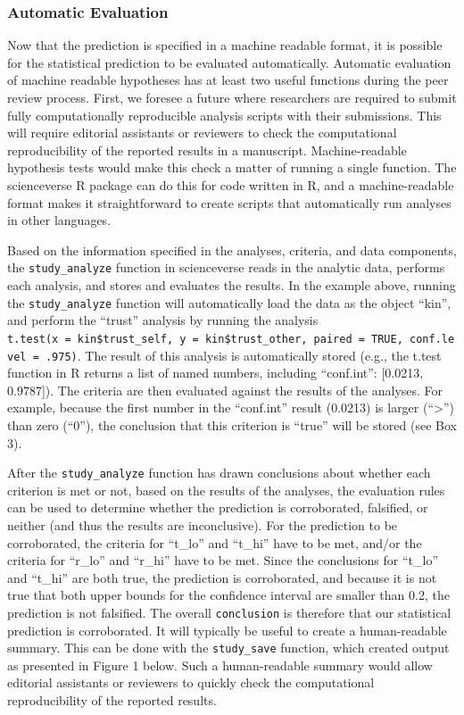 \documentclass[
  english,
  doc,floatsintext]{apa6}
\begin{document}
\hypertarget{automatic-evaluation}{%
\subsubsection{Automatic Evaluation}\label{automatic-evaluation}}

Now that the prediction is specified in a machine readable format, it is possible for the statistical prediction to be evaluated automatically. Automatic evaluation of machine readable hypotheses has at least two useful functions during the peer review process. First, we foresee a future where researchers are required to submit fully computationally reproducible analysis scripts with their submissions. This will require editorial assistants or reviewers to check the computational reproducibility of the reported results in a manuscript. Machine-readable hypothesis tests would make this check a matter of running a single function. The scienceverse R package can do this for code written in R, and a machine-readable format makes it straightforward to create scripts that automatically run analyses in other languages.

Based on the information specified in the analyses, criteria, and data components, the \texttt{study\_analyze} function in scienceverse reads in the analytic data, performs each analysis, and stores and evaluates the results. In the example above, running the \texttt{study\_analyze} function will automatically load the data as the object \enquote{kin}, and perform the \enquote{trust} analysis by running the analysis \texttt{t.test(x\ =\ kin\$trust\_self,\ y\ =\ kin\$trust\_other,\ paired\ =\ TRUE,\ conf.level\ =\ .975)}. The result of this analysis is automatically stored (e.g., the t.test function in R returns a list of named numbers, including \enquote{conf.int}: {[}0.0213, 0.9787{]}). The criteria are then evaluated against the results of the analyses. For example, because the first number in the \enquote{conf.int} result (0.0213) is larger (\enquote{\textgreater{}}) than zero (\enquote{0}), the conclusion that this criterion is \enquote{true} will be stored (see Box 3).

After the \texttt{study\_analyze} function has drawn conclusions about whether each criterion is met or not, based on the results of the analyses, the evaluation rules can be used to determine whether the prediction is corroborated, falsified, or neither (and thus the results are inconclusive). For the prediction to be corroborated, the criteria for \enquote{t\_lo} and \enquote{t\_hi} have to be met, and/or the criteria for \enquote{r\_lo} and \enquote{r\_hi} have to be met. Since the conclusions for \enquote{t\_lo} and \enquote{t\_hi} are both true, the prediction is corroborated, and because it is not true that both upper bounds for the confidence interval are smaller than 0.2, the prediction is not falsified. The overall \texttt{conclusion} is therefore that our statistical prediction is corroborated. It will typically be useful to create a human-readable summary. This can be done with the \texttt{study\_save} function, which created output as presented in Figure 1 below. Such a human-readable summary would allow editorial assistants or reviewers to quickly check the computational reproducibility of the reported results.
\end{document}
